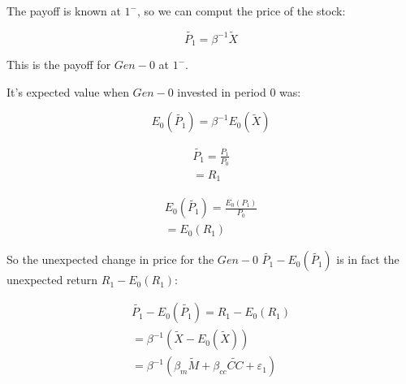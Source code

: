The payoff is known at $1^{-}$, so 
we can comput the price of the stock:

\begin{equation}
    \tilde{P_1} = \beta^{-1}\tilde{X}
\end{equation}

This is the payoff for $Gen-0$ at $1^{-}$.

It's expected value when $Gen-0$ invested in period 0 was:

\begin{equation}
    E_0(\tilde{P_1}) = \beta^{-1} E_0(\tilde{X})
\end{equation}


\begin{equation}
    \begin{aligned}
    \tilde{P_1} = \frac{P_1}{P_0} \\
    = R_1
    \end{aligned}
\end{equation}


\begin{equation}
    \begin{aligned}
    E_0(\tilde{P_1}) = \frac{E_0(P_1)}{P_0} \\
    = E_0(R_1)
    \end{aligned}
\end{equation}

So the unexpected change in price 
for the $Gen-0$ $\tilde{P_1} - E_0(\tilde{P_1})$ is in fact
the unexpected return $R_1 - E_0(R_1)$:

\begin{equation}
    \begin{aligned}
    \tilde{P_1} - E_0(\tilde{P_1}) = R_1 - E_0(R_1) \\
    = \beta^{-1} (\tilde{X} - E_0(\tilde{X})) \\
    = \beta^{-1} (\beta_m \tilde{M} + \beta_{cc} \tilde{CC} + \varepsilon_1)
    \end{aligned}
\end{equation}




